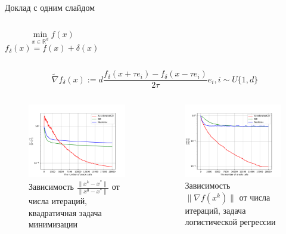 \documentclass{beamer}
\begin{document}
\begin{frame}{Доклад с одним слайдом}

\begin{columns}[c]
    $$\min\limits_{x \in \mathbb{R}^d} f(x)$$
    $$f_\delta (x) = f(x) + \delta (x)$$
\end{columns}

$$\widetilde{\nabla} f_\delta (x) := d\frac{f_\delta (x + \tau e_i) - f_\delta (x - \tau e_i)}{2\tau} e_i, i \sim U\{1, d\}$$

\begin{columns}[c]
    \begin{figure}
    \includegraphics[width=1.0\textwidth]{Deterministic_quadratic_AGD_GD_Nesterov_18.pdf}
        \caption*{Зависимость $\frac{\|x^k - x^*\|}{\|x^0 - x^*\|}$ от числа итераций, квадратичная задача минимизации}
    \end{figure}

    \begin{figure}
    \includegraphics[width=1.0\textwidth]{Non_stochastic_Logreg_AGD_GD_Nesterov_18_1e-06_0.0001.pdf}
        \caption*{Зависимость $\|\nabla f(x^k)\|$ от числа итераций, задача логистической регрессии}
    \end{figure}
\end{columns}


\end{frame}
\end{document}
